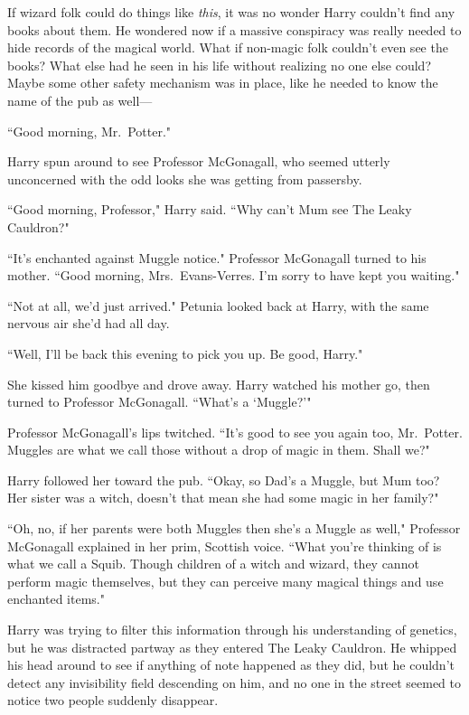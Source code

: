 If wizard folk could do things like \emph{this}, it was no wonder
Harry couldn't find any books about them. He wondered
now if a massive conspiracy was really needed to hide
records of the magical world. What if non-magic folk
couldn't even see the books? What else had he seen in
his life without realizing no one else could? Maybe some
other safety mechanism was in place, like he needed to
know the name of the pub as well---

``Good morning, Mr.~Potter."

Harry spun around to see Professor McGonagall, who
seemed utterly unconcerned with the odd
looks she was getting from passersby.

``Good morning, Professor," Harry said. ``Why can't Mum
see The Leaky Cauldron?"

``It's enchanted against Muggle notice." Professor McGonagall
turned to his mother. ``Good morning, Mrs.~Evans-Verres.
I'm sorry to have kept you waiting."

``Not at all, we'd just arrived." Petunia looked back at
Harry, with the same nervous air she'd had all day.

``Well, I'll be back this evening to pick you up. Be good, Harry."

She kissed him goodbye and drove away. Harry watched his mother
go, then turned to Professor McGonagall. ``What's a `Muggle?'"

Professor McGonagall's lips twitched. ``It's good to see you
again too, Mr.~Potter. Muggles are what we call those
without a drop of magic in them. Shall we?"

Harry followed her toward the pub. ``Okay, so Dad's a
Muggle, but Mum too? Her sister was a witch, doesn't that
mean she had some magic in her family?"

``Oh, no, if her parents were both Muggles then she's
a Muggle as well," Professor McGonagall explained in her prim,
Scottish voice. ``What you're thinking of is what we call a
Squib. Though children of a witch and wizard, they cannot
perform magic themselves, but they can perceive
many magical things and use enchanted items."

Harry was trying to filter this information through his
understanding of genetics, but he was distracted partway as
they entered The Leaky Cauldron. He whipped his head
around to see if anything of note happened as they did,
but he couldn't detect any invisibility field descending on him,
and no one in the street seemed to notice two people
suddenly disappear.


